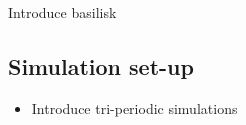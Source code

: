 Introduce basilisk 
\subsection{Simulation set-up}
\begin{itemize}
    \item Introduce tri-periodic simulations
\end{itemize}